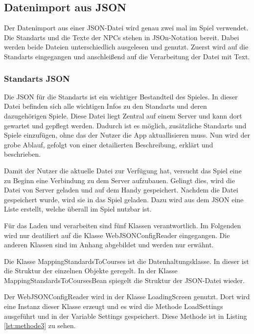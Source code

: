 \subsection{Datenimport aus JSON}

Der Datenimport aus einer JSON-Datei wird genau zwei mal im Spiel verwendet. Die Standarts und die Texte der NPCs stehen in JSOn-Notation bereit. Dabei werden beide Dateien unterschiedlich ausgelesen und genutzt. Zuerst wird auf die Standarts eingegangen und anschleißend auf die Verarbeitung der Datei mit Text. 

\subsubsection{Standarts JSON}
Die JSON für die Standarts ist ein wichtiger Bestandteil des Spieles. In dieser Datei befinden sich alle wichtigen Infos zu den Standarts und deren dazugehörigen Spiele. Diese Datei liegt Zentral auf einem Server und kann dort gewartet und gepflegt werden. Dadurch ist es möglich, zusätzliche Standarts und Spiele einzufügen, ohne das der Nutzer die App aktuallisieren muss. Nun wird der grobe Ablauf, gefolgt von einer detailierten Beschreibung, erklärt und beschrieben.

Damit der Nutzer die aktuelle Datei zur Verfügung hat, versucht das Spiel eine zu Beginn eine Verbindung zu dem Server aufzubauen. Gelingt dies, wird die Datei von Server geladen und auf dem Handy gespeichert. Nachdem die Datei gespeichert wurde, wird sie in das Spiel geladen. Dazu wird aus dem JSON eine Liste erstellt, welche überall im Spiel nutzbar ist.

Für das Laden und verarbeiten sind fünf Klassen verantwortlich. Im Folgenden wird nur deatiliert auf die Klasse WebJSONConfigReader eingegangen. Die anderen Klassen sind im Anhang abgebildet und werden nur erwähnt.

Die Klasse MappingStandardsToCourses ist die Datenhaltungsklasse. In dieser ist die Struktur der einzelnen Objekte geregelt. In der Klasse MappingStandardsToCoursesBean spiegelt die Struktur der JSON-Datei wieder. 

Der WebJSONConfigReader wird in der Klasse LoadingScreen genutzt. Dort wird eine Instanz dieser Klasse erzeugt und es wird die Methode LoadSettings ausgeführt und in der Variable Settings gespeichert. Diese Methode ist in Listing \ref{lst:methode3} zu sehen.


